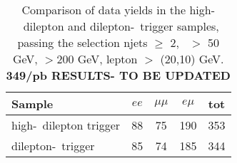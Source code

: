 \begin{table}[htb]
\begin{center}
\caption{\label{tab:yields4} Comparison of data yields in the high-\pt\ dilepton and dilepton-\Ht\ 
trigger samples, passing the selection njets $\geq$ 2, \met\ $>$ 50 GeV, \Ht$>$200 GeV,  lepton \pt $>$ (20,10) GeV.
{\bf 349/pb RESULTS- TO BE UPDATED}
}
\vspace{.25cm}
\begin{tabular}{l|cccc}
\hline
                    Sample   &           $ee$   &       $\mu\mu$   &         $e\mu$   &            tot  \\
\hline
high-\pt\ dilepton trigger   &             88   &             75   &            190   &            353  \\

dilepton-\Ht\ trigger        &             85   &             74   &            185   &            344  \\
\hline
\end{tabular}
\end{center}
\end{table}
